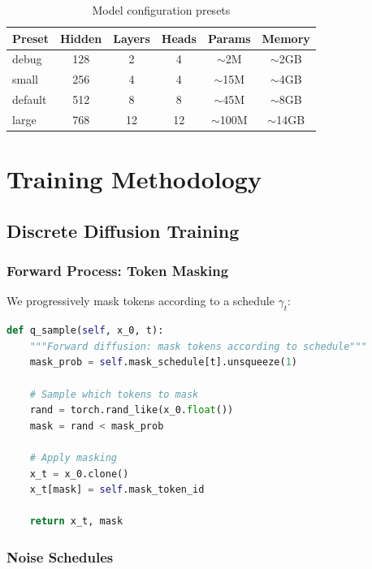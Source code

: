 \documentclass[11pt,a4paper]{article}
\begin{document}
\begin{table}[H]
\centering
\caption{Model configuration presets}
\begin{tabular}{lccccc}
\toprule
\textbf{Preset} & \textbf{Hidden} & \textbf{Layers} & \textbf{Heads} & \textbf{Params} & \textbf{Memory} \\
\midrule
debug & 128 & 2 & 4 & $\sim$2M & $\sim$2GB \\
small & 256 & 4 & 4 & $\sim$15M & $\sim$4GB \\
default & 512 & 8 & 8 & $\sim$45M & $\sim$8GB \\
large & 768 & 12 & 12 & $\sim$100M & $\sim$14GB \\
\bottomrule
\end{tabular}
\label{tab:configs}
\end{table}

\section{Training Methodology}

\subsection{Discrete Diffusion Training}

\subsubsection{Forward Process: Token Masking}

We progressively mask tokens according to a schedule $\gamma_t$:

\begin{lstlisting}[language=Python]
def q_sample(self, x_0, t):
    """Forward diffusion: mask tokens according to schedule"""
    mask_prob = self.mask_schedule[t].unsqueeze(1)
    
    # Sample which tokens to mask
    rand = torch.rand_like(x_0.float())
    mask = rand < mask_prob
    
    # Apply masking
    x_t = x_0.clone()
    x_t[mask] = self.mask_token_id
    
    return x_t, mask
\end{lstlisting}

\subsubsection{Noise Schedules}
\end{document}
